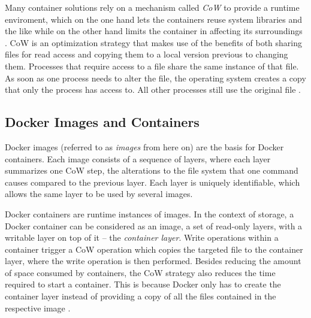     Many container solutions rely on a mechanism called \emph{\ac{CoW}} to provide a runtime enviroment, which on the one hand lets the containers reuse system libraries and the like while on the other hand limits the container in affecting its surroundings \cite{Docker????Dockera,Pahl2015Containerization}.
    \ac{CoW} is an optimization strategy that makes use of the benefits of both sharing files for read access and copying them to a local version previous to changing them. Processes that require access to a file share the same instance of that file. As soon as one process needs to alter the file, the operating system creates a copy that only the process has access to. All other processes still use the original file \cite{Pahl2015Containerization,Docker????Dockera}.

  \subsection{Docker Images and Containers} %
  \label{sub:docker_images_and_containers}
    Docker images (referred to as \emph{images} from here on) are the basis for Docker containers. Each image consists of a sequence of layers, where each layer summarizes one \ac{CoW} step, \ie the alterations to the file system that one command causes compared to the previous layer. Each layer is uniquely identifiable, which allows the same layer to be used by several images.

    Docker containers are runtime instances of images.
    In the context of storage, a Docker container can be considered as an image, \ie a set of read-only layers, with a writable layer on top of it -- the \emph{container layer}. Write operations within a container trigger a \ac{CoW} operation which copies the targeted file to the container layer, where the write operation is then performed.
    Besides reducing the amount of space consumed by containers, the \ac{CoW} strategy also reduces the time required to start a container. This is because Docker only has to create the container layer instead of providing a copy of all the files contained in the respective image \cite{Docker????Dockera}.

